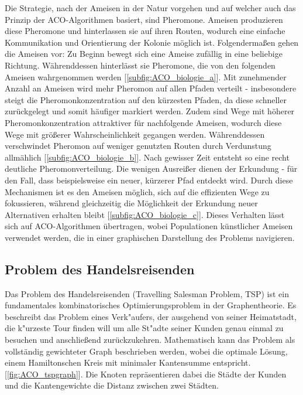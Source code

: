 \documentclass[pdftex,
               12pt,
               DIV=12,
               a4paper,
               twoside,
               parskip=half,
               abstract=true,
               dvipsnames]{scrartcl}
\begin{document}
Die Strategie, nach der Ameisen in der Natur vorgehen und auf welcher auch das Prinzip der ACO-Algorithmen basiert, sind Pheromone. Ameisen produzieren diese Pheromone und hinterlassen sie auf ihren Routen, wodurch eine einfache Kommunikation und Orientierung der Kolonie m\"oglich ist.
Folgendermaßen gehen die Ameisen vor: Zu Beginn bewegt sich eine Ameise zuf\"allig in eine beliebige Richtung. W\"ahrenddessen hinterl\"asst sie Pheromone, die von den folgenden Ameisen wahrgenommen werden [\cref{subfig:ACO_biologie_a}]. Mit zunehmender Anzahl an Ameisen wird mehr Pheromon auf allen Pfaden verteilt - insbesondere steigt die Pheromonkonzentration auf den k\"urzesten Pfaden, da diese schneller zur\"uckgelegt und somit h\"aufiger markiert werden. Zudem sind Wege mit h\"oherer Pheromonkonzentration attraktiver f\"ur nachfolgende Ameisen, wodurch diese Wege mit gr\"o\ss erer Wahrscheinlichkeit gegangen werden. W\"ahrenddessen verschwindet Pheromon auf weniger genutzten Routen durch Verdunstung allm\"ahlich [\cref{subfig:ACO_biologie_b}]. Nach gewisser Zeit entsteht so eine recht deutliche Pheromonverteilung. Die wenigen Ausreißer dienen der Erkundung - f\"ur den Fall, dass beispielsweise ein neuer, k\"urzerer Pfad entdeckt wird. Durch diese Mechanismen ist es den Ameisen m\"oglich, sich auf die effizienten Wege zu fokussieren, w\"ahrend gleichzeitig die M\"oglichkeit der Erkundung neuer Alternativen erhalten bleibt [\cref{subfig:ACO_biologie_c}].  Dieses Verhalten l\"asst sich auf ACO-Algorithmen \"ubertragen, wobei Populationen k\"unstlicher Ameisen verwendet werden, die in einer graphischen Darstellung des Problems navigieren. \cite[vgl.][]{DorigoStuetzle04}


\subsection{Problem des Handelsreisenden}
Das Problem des Handelsreisenden (Travelling Salesman Problem, TSP) ist ein fundamentales kombinatorisches Optimierungsproblem in der Graphentheorie. Es beschreibt das Problem eines Verk"aufers, der ausgehend von seiner Heimatstadt, die k"urzeste Tour finden will um alle St"adte seiner Kunden genau einmal zu besuchen und anschließend zur\"uckzukehren. Mathematisch kann das Problem als vollst\"andig gewichteter Graph beschrieben werden, wobei die optimale L\"osung, einem Hamiltonschen Kreis mit minimaler Kantensumme entspricht. [\cref{fig:ACO_tspgraph}]. Die Knoten repr\"asentieren dabei die St\"adte der Kunden und die Kantengewichte die Distanz zwischen zwei St\"adten. \cite[vgl.][]{DorigoStuetzle04}
\end{document}
